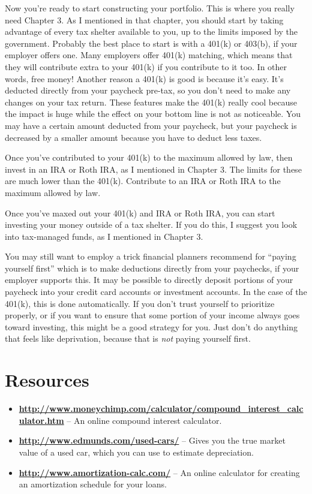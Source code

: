 Now you're ready to start constructing your portfolio. This is where you really need Chapter 3. As I mentioned in that chapter, you should start by taking advantage of every tax shelter available to you, up to the limits imposed by the government. Probably the best place to start is with a 401(k) or 403(b), if your employer offers one. Many employers offer 401(k) matching, which means that they will contribute extra to your 401(k) if you contribute to it too. In other words, free money! Another reason a 401(k) is good is because it's easy. It's deducted directly from your paycheck pre-tax, so you don't need to make any changes on your tax return. These features make the 401(k) really cool because the impact is huge while the effect on your bottom line is not as noticeable. You may have a certain amount deducted from your paycheck, but your paycheck is decreased by a smaller amount because you have to deduct less taxes.

Once you've contributed to your 401(k) to the maximum allowed by law, then invest in an IRA or Roth IRA, as I mentioned in Chapter 3. The limits for these are much lower than the 401(k). Contribute to an IRA or Roth IRA to the maximum allowed by law.

Once you've maxed out your 401(k) and IRA or Roth IRA, you can start investing your money outside of a tax shelter. If you do this, I suggest you look into tax-managed funds, as I mentioned in Chapter 3.

You may still want to employ a trick financial planners recommend for “paying yourself first” which is to make deductions directly from your paychecks, if your employer supports this. It may be possible to directly deposit portions of your paycheck into your credit card accounts or investment accounts. In the case of the 401(k), this is done automatically. If you don't trust yourself to prioritize properly, or if you want to ensure that some portion of your income always goes toward investing, this might be a good strategy for you. Just don't do anything that feels like deprivation, because that is \emph{not} paying yourself first.

\newpage
\section{Resources}
\begin{itemize}
\item \textbf{\url{http://www.moneychimp.com/calculator/compound_interest_calculator.htm}} -- An online compound interest calculator.
\item \textbf{\url{http://www.edmunds.com/used-cars/}} -- Gives you the true market value of a used car, which you can use to estimate depreciation.
\item \textbf{\url{http://www.amortization-calc.com/}} -- An online calculator for creating an amortization schedule for your loans.
\end{itemize}

